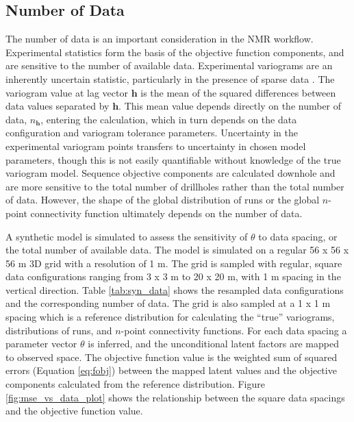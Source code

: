 \FloatBarrier
\subsection{Number of Data}
\label{subsec:04ndata}

The number of data is an important consideration in the \gls{NMR} workflow. Experimental statistics form the basis of the objective function components, and are sensitive to the number of available data. Experimental variograms are an inherently uncertain statistic, particularly in the presence of sparse data \citep{ortiz2002calculation,pardo-iguzquiza2012varboot}. The variogram value at lag vector $\mathbf{h}$ is the mean of the squared differences between data values separated by $\mathbf{h}$. This mean value depends directly on the number of data, $n_{\mathbf{h}}$, entering the calculation, which in turn depends on the data configuration and variogram tolerance parameters. Uncertainty in the experimental variogram points transfers to uncertainty in chosen model parameters, though this is not easily quantifiable without knowledge of the true variogram model. Sequence objective components are calculated downhole and are more sensitive to the total number of drillholes rather than the total number of data. However, the shape of the global distribution of runs or the global $n$-point connectivity function ultimately depends on the number of data.

A synthetic model is simulated to assess the sensitivity of $\theta$ to data spacing, or the total number of available data. The model is simulated on a regular 56 x 56 x 56 m \gls{3D} grid with a resolution of 1 m. The grid is sampled with regular, square data configurations ranging from 3 x 3 m to 20 x 20 m, with 1 m spacing in the vertical direction. Table \ref{tab:syn_data} shows the resampled data configurations and the corresponding number of data. The grid is also sampled at a 1 x 1 m spacing which is a reference distribution for calculating the ``true'' variograms, distributions of runs, and $n$-point connectivity functions. For each data spacing a parameter vector $\theta$ is inferred, and the unconditional latent factors are mapped to observed space. The objective function value is the weighted sum of squared errors (Equation \ref{eq:fobj}) between the mapped latent values and the objective components calculated from the reference distribution. Figure \ref{fig:mse_vs_data_plot} shows the relationship between the square data spacings and the objective function value.

